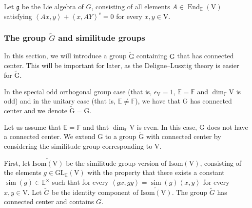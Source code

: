\documentclass[12pt, reqno]{amsart}
\theoremstyle{definition}
\theoremstyle{definition}
\theoremstyle{definition}
\newcommand{\multiplicativegroup}[1]{#1^{\times}}
\newcommand{\EndomorphismRing}{\operatorname{End}}
\newcommand{\hermitianSpace}{\mathrm{V}}
\newcommand{\similitudeCharacter}{\operatorname{sim}}
\newcommand{\innerproduct}[2]{\left\langle #1,#2\right\rangle}
\newcommand{\involution}[1]{#1^{c}}
\newcommand{\GL}{\mathrm{GL}}
\newcommand{\GroupExtension}[1]{\widetilde{#1}}
\newcommand{\finiteField}{\mathbb{F}}
\newcommand{\quadraticExtension}{\mathbb{E}}
\newcommand{\IsometryGroup}{\mathrm{Isom}}
\newcommand{\lieAlgebra}{\mathfrak{g}}
\newcommand{\algebraicGroup}[1]{\boldsymbol{\mathrm{#1}}}
\begin{document}
Let $\lieAlgebra$ be the Lie algebra of $G$, consisting of all elements $A \in \EndomorphismRing_{\quadraticExtension}\left(\hermitianSpace\right)$ satisfying $\innerproduct{Ax}{y} + \involution{\innerproduct{x}{AY}} = 0$ for every $x, y \in \hermitianSpace$.

\subsubsection{The group $\tilde{G}$ and similitude groups}\label{subsec:similitute-groups}
In this section, we will introduce a group $\tilde{\algebraicGroup{G}}$ containing $\algebraicGroup{G}$ that has connected center. This will be important for later, as the Deligne--Lusztig theory  is easier  for $\tilde{\algebraicGroup{G}}$.

In the special odd orthogonal group case (that is, $\epsilon_{\hermitianSpace} = 1$, $\quadraticExtension = \finiteField$ and $\dim_{\finiteField} \hermitianSpace$ is odd) and in the unitary case (that is, $\quadraticExtension \ne \finiteField$), we have that $\algebraicGroup{G}$ has connected center and we denote $\tilde{\algebraicGroup{G}} = \algebraicGroup{G}$.

Let us assume that $\quadraticExtension = \finiteField$ and that $\dim_{\finiteField} \hermitianSpace$ is even. In this case, $\algebraicGroup{G}$ does not have a connected center. We extend $\algebraicGroup{G}$ to a group $\tilde{\algebraicGroup{G}}$ with connected center by considering the similitude group corresponding to $\hermitianSpace$.

First, let $\GroupExtension{\IsometryGroup\left(\hermitianSpace\right)}$ be the similitude group version of $\IsometryGroup\left(\hermitianSpace\right)$, consisting of the elements $g \in \GL_{\quadraticExtension}\left(\hermitianSpace\right)$ with the property that there exists a constant $\similitudeCharacter\left(g\right) \in \multiplicativegroup{\quadraticExtension}$ such that for every $\innerproduct{gx}{gy} = \similitudeCharacter\left(g\right) \innerproduct{x}{y}$ for every $x,y \in \hermitianSpace$. Let $\GroupExtension{G}$ be the identity component of $\GroupExtension{\IsometryGroup\left(\hermitianSpace\right)}$. The group $\GroupExtension{G}$ has connected center and contains $G$.
\end{document}
